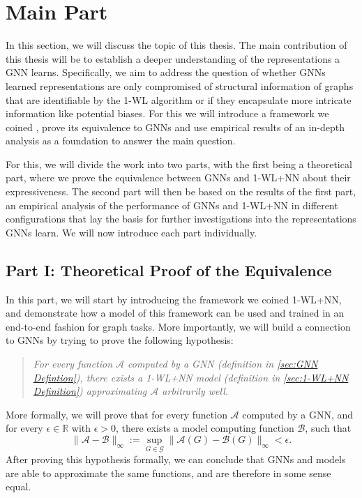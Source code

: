 \documentclass[11pt, dvipsnames, DIV=12]{scrreprt}
\theoremstyle{definition}
\newcommand{\Rb}{\mathbb{R}}
\newcommand{\wlnn}{\text{1-WL+NN }}
\begin{document}
\section{Main Part}
In this section, we will discuss the topic of this thesis. The main contribution of this thesis will be to establish a deeper understanding of the representations a GNN learns. Specifically, we aim to address the question of whether GNNs learned representations are only compromised of structural information of graphs that are identifiable by the 1-WL algorithm or if they encapsulate more intricate information like potential biases. For this we will introduce a framework we coined \wlnn, prove its equivalence to GNNs and use empirical results of an in-depth analysis as a foundation to answer the main question.

For this, we will divide the work into two parts, with the first being a theoretical part, where we prove the equivalence between GNNs and 1-WL+NN about their expressiveness. The second part will then be based on the results of the first part, an empirical analysis of the performance of GNNs and 1-WL+NN in different configurations that lay the basis for further investigations into the representations GNNs learn. We will now introduce each part individually.

\subsection{Part I: Theoretical Proof of the Equivalence}
In this part, we will start by introducing the framework we coined 1-WL+NN, and demonstrate how a model of this framework can be used and trained in an end-to-end fashion for graph tasks. More importantly, we will build a connection to GNNs by trying to prove the following hypothesis:

\begin{quote}
\textit{
    For every function $\mathcal{A}$ computed by a GNN (definition in \autoref{sec:GNN Defintion}), there exists a 1-WL+NN model (definition in \autoref{sec:1-WL+NN Definition}) approximating $\mathcal{A}$ arbitrarily well.
}
\end{quote}
More formally, we will prove that for every function $\mathcal{A}$ computed by a GNN, and for every $\epsilon \in \Rb$ with $\epsilon >0$, there exists a \wlnn model computing function $\mathcal{B}$, such that
\begin{equation}
    \|\mathcal{A} - \mathcal{B}\|_\infty := \sup_{G \in \mathcal{G}} \|\mathcal{A}(G) - \mathcal{B}(G)\|_\infty < \epsilon. \label{eq:approximating}
\end{equation}
After proving this hypothesis formally, we can conclude that GNNs and \wlnn models are able to approximate the same functions, and are therefore in some sense equal.
\end{document}
